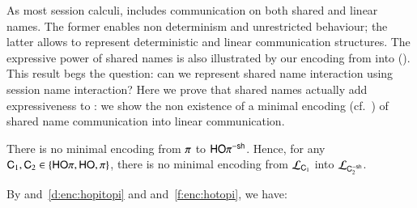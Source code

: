 \documentclass[runningheads]{llncs}
\begin{document}
{As most session calculi, 
\HOp includes communication on both shared and linear names.
The former enables non determinism and unrestricted behaviour; the latter allows to represent
deterministic and linear communication structures.
The expressive power of shared names is also illustrated by our 
encoding from \HOp into \sessp ().
This result begs the question: 
can we represent shared name interaction using session name interaction?
Here we prove that shared names actually add expressiveness to \HOp:
we show
the non existence of a minimal encoding 
(cf.~)
of shared name 
communication into linear 
communication. %


\begin{theorem}%
	\label{t:negative}
	There is no minimal encoding from
		$\pi$ to $\mathsf{HO}\pi^{\mathsf{-sh}}$.
	Hence, for any
		$\mathsf{C}_1,\mathsf{C}_2\in \{ \mathsf{HO}\pi, \mathsf{HO}, \pi\}$, 
	there is no minimal encoding from  
	$\mathcal{L}_{\mathsf{C}_1}$ 
	into
		$\mathcal{L}_{\mathsf{C}_2^{-\mathsf{sh}}}$.
\end{theorem}


By 
	 and~\ref{d:enc:hopitopi} 
	and  and~\ref{f:enc:hotopi}, 
we have:
\smallskip 
{}


}
\end{document}
